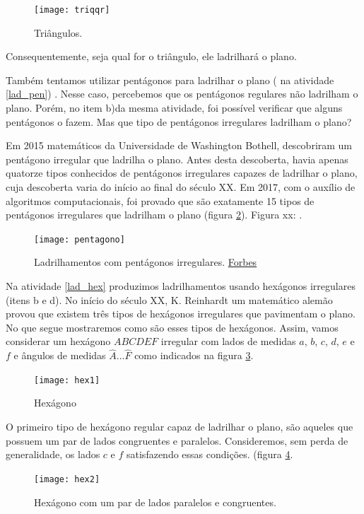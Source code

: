 \begin{figure}[H]
\centering
\texttt{[image: triqqr]}
\label{triqqr}
\caption{Triângulos.}
\end{figure}

Consequentemente, seja qual for o triângulo, ele ladrilhará o plano.

Também tentamos utilizar pentágonos para ladrilhar o plano ( na atividade \ref{lad_pen}) . Nesse caso, percebemos que os pentágonos regulares não ladrilham o plano. Porém, no item b)da mesma atividade, foi possível verificar  que alguns pentágonos o fazem. Mas que tipo de pentágonos irregulares ladrilham o plano?

Em 2015 matemáticos da  Universidade de Washington Bothell, descobriram um pentágono irregular que ladrilha o plano. Antes desta descoberta, havia apenas quatorze tipos conhecidos de pentágonos irregulares capazes de ladrilhar o  plano, cuja descoberta varia do início ao final do século XX. Em 2017, com o auxílio de algoritmos computacionais, foi provado que são exatamente 15 tipos de pentágonos irregulares que ladrilham o plano (figura \ref{pentagono}).
Figura xx: .

\begin{figure}[H]
\centering
\texttt{[image: pentagono]}
\label{pentagono}
\caption{Ladrilhamentos com pentágonos irregulares. \href{encurtador.com.br/dmuE3}{Forbes}}
\end{figure}



Na atividade \ref{lad_hex} produzimos ladrilhamentos usando hexágonos irregulares (itens b e d). No início do século XX, K. Reinhardt um matemático alemão provou que existem três tipos de hexágonos irregulares que pavimentam o plano. No que segue mostraremos como são esses tipos de hexágonos. Assim, vamos considerar um hexágono $ABCDEF$ irregular com lados de medidas $a$, $b$, $c$, $d$, $e$ e $f$ e ângulos de medidas $\hat{A}... \hat{F}$ como indicados na figura \ref{hex1}.

\begin{figure}[H]
\centering
\texttt{[image: hex1]}
\label{hex1}
\caption{Hexágono}
\end{figure}

O primeiro tipo de hexágono regular capaz de ladrilhar o plano, são aqueles que possuem um par de lados congruentes e paralelos. Consideremos, sem perda de generalidade, os lados $c$ e $f$ satisfazendo essas condições.  (figura \ref{hex2}.

\begin{figure}[H]
\centering
\texttt{[image: hex2]}
\label{hex2}
\caption{Hexágono com um par de lados paralelos e congruentes.}
\end{figure}

